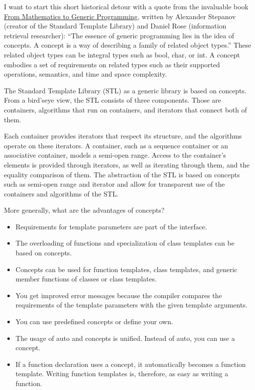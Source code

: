 \begin{tcolorbox}[colback=blue!5!white,colframe=blue!75!black,title=Tip Headline]
I want to start this short historical detour with a quote from the invaluable book \href{https://www.fm2gp.com/}{From Mathematics to Generic Programming}, written by Alexander Stepanov (creator of the Standard Template Library) and Daniel Rose (information retrieval researcher): “The essence of generic programming lies in the idea of concepts. A concept is a way of describing a family of related object types.” These related object types can be integral types such as bool, char, or int. A concept embodies a set of requirements on related types such as their supported operations, semantics, and time and space complexity.

The Standard Template Library (STL) as a generic library is based on concepts. From a bird’seye view, the STL consists of three components. Those are containers, algorithms that run on containers, and iterators that connect both of them.

Each container provides iterators that respect its structure, and the algorithms operate on these iterators. A container, such as a sequence container or an associative container, models a semi-open range. Access to the container’s elements is provided through iterators, as well as iterating through them, and the equality comparison of them. The abstraction of the STL is based on concepts such as semi-open range and iterator and allow for transparent use of the containers and algorithms of the STL.
\end{tcolorbox}

More generally, what are the advantages of concepts?


\begin{itemize}
\item 
Requirements for template parameters are part of the interface.

\item 
The overloading of functions and specialization of class templates can be based on concepts.

\item 
Concepts can be used for function templates, class templates, and generic member functions of classes or class templates.

\item 
You get improved error messages because the compiler compares the requirements of the template parameters with the given template arguments.

\item 
You can use predefined concepts or define your own.

\item 
The usage of auto and concepts is unified. Instead of auto, you can use a concept.

\item 
If a function declaration uses a concept, it automatically becomes a function template. Writing function templates is, therefore, as easy as writing a function.
\end{itemize}


